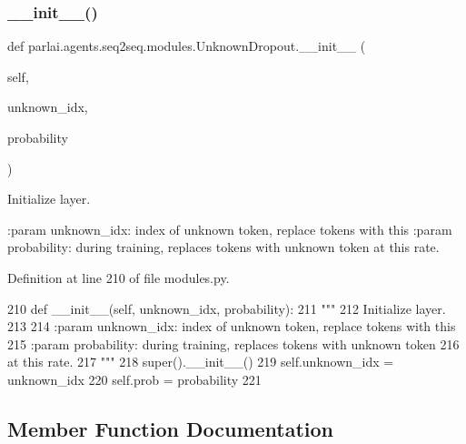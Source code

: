 \subsubsection{\texorpdfstring{\+\_\+\+\_\+init\+\_\+\+\_\+()}{\_\_init\_\_()}}
{\footnotesize\ttfamily def parlai.\+agents.\+seq2seq.\+modules.\+Unknown\+Dropout.\+\_\+\+\_\+init\+\_\+\+\_\+ (\begin{DoxyParamCaption}\item[{}]{self,  }\item[{}]{unknown\+\_\+idx,  }\item[{}]{probability }\end{DoxyParamCaption})}

\begin{DoxyVerb}Initialize layer.

:param unknown_idx: index of unknown token, replace tokens with this
:param probability: during training, replaces tokens with unknown token
            at this rate.
\end{DoxyVerb}
 

Definition at line 210 of file modules.\+py.


\begin{DoxyCode}
210     \textcolor{keyword}{def }\_\_init\_\_(self, unknown\_idx, probability):
211         \textcolor{stringliteral}{"""}
212 \textcolor{stringliteral}{        Initialize layer.}
213 \textcolor{stringliteral}{}
214 \textcolor{stringliteral}{        :param unknown\_idx: index of unknown token, replace tokens with this}
215 \textcolor{stringliteral}{        :param probability: during training, replaces tokens with unknown token}
216 \textcolor{stringliteral}{                            at this rate.}
217 \textcolor{stringliteral}{        """}
218         super().\_\_init\_\_()
219         self.unknown\_idx = unknown\_idx
220         self.prob = probability
221 
\end{DoxyCode}


\subsection{Member Function Documentation}
\mbox{\label{classparlai_1_1agents_1_1seq2seq_1_1modules_1_1UnknownDropout_ae0771638ed591c911178d94cd2bdc59d}} 
